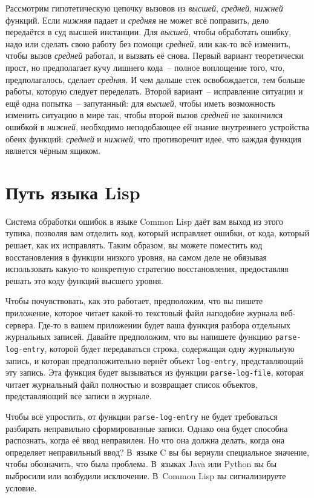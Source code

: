 Рассмотрим гипотетическую цепочку вызовов из \emph{высшей}, \emph{средней}, \emph{нижней}
функций. Если \emph{нижняя} падает и \emph{средняя} не может всё поправить, дело
передаётся в суд высшей инстанции. Для \emph{высшей}, чтобы обработать ошибку, надо или
сделать свою работу без помощи \emph{средней}, или как-то всё изменить, чтобы вызов
\emph{средней} работал, и вызвать её снова. Первый вариант теоретически прост, но
предполагает кучу лишнего кода~-- полное воплощение того, что, предполагалось, сделает
\emph{средняя}. И чем дальше стек освобождается, тем больше работы, которую следует
переделать. Второй вариант~-- исправление ситуации и ещё одна попытка~-- запутанный:
для \emph{высшей}, чтобы иметь возможность изменить ситуацию в мире так, чтобы второй
вызов \emph{средней} не закончился ошибкой в \emph{нижней}, необходимо неподобающее ей
знание внутреннего устройства обеих функций: \emph{средней} и \emph{нижней}, что
противоречит идее, что каждая функция является чёрным ящиком.

\section{Путь языка Lisp}

Система обработки ошибок в языке Common Lisp даёт вам выход из этого тупика, позволяя вам
отделить код, который исправляет ошибки, от кода, который решает, как их исправлять. Таким
образом, вы можете поместить код восстановления в функции низкого уровня, на самом деле не
обязывая использовать какую-то конкретную стратегию восстановления, предоставляя решать
это коду функций высшего уровня.

Чтобы почувствовать, как это работает, предположим, что вы пишете приложение, которое
читает какой-то текстовый файл наподобие журнала веб-сервера. Где-то в вашем приложении
будет ваша функция разбора отдельных журнальных записей. Давайте предположим, что вы
напишете функцию \lstinline{parse-log-entry}, которой будет передаваться строка, содержащая
одну журнальную запись, и которая предположительно вернёт объект \lstinline{log-entry},
представляющий эту запись. Эта функция будет вызываться из функции \lstinline{parse-log-file},
которая читает журнальный файл полностью и возвращает список объектов, представляющий все
записи в журнале.

Чтобы всё упростить, от функции \lstinline{parse-log-entry} не будет требоваться разбирать
неправильно сформированные записи. Однако она будет способна распознать, когда её ввод
неправилен. Но что она должна делать, когда она определяет неправильный ввод? В~языке C вы
бы вернули специальное значение, чтобы обозначить, что была проблема. В~языках Java или
Python вы бы выбросили или возбудили исключение. В~Common Lisp вы сигнализируете условие.

